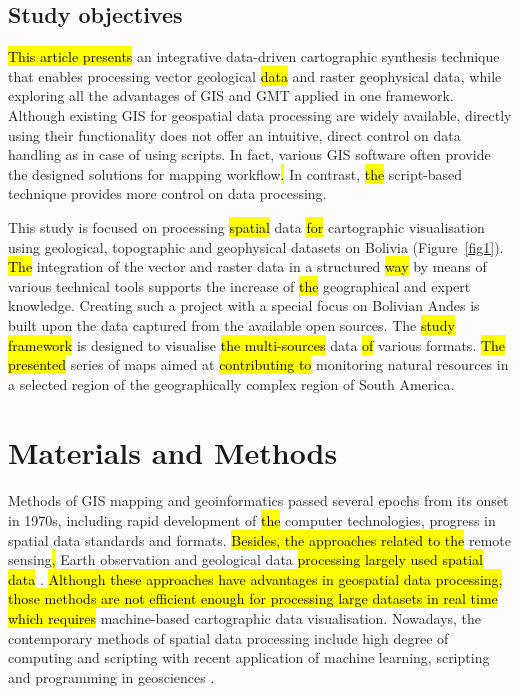 \documentclass[data,article,submit,pdftex,moreauthors]{Definitions/mdpi}
\begin{document}
\subsection{Study objectives}
\hl{This article presents} an integrative data-driven cartographic synthesis technique that enables processing vector geological \hl{data} and raster geophysical data, while exploring all the advantages of GIS and GMT applied in one framework. Although existing GIS for geospatial data processing are widely available, directly using their functionality does not offer an intuitive, direct control on data handling as in case of using scripts. In fact, various GIS software often provide the designed solutions for mapping workflow\hl{.} In contrast, \hl{the} script-based technique provides more control on data processing. 

This study is focused on processing \hl{spatial} data \hl{for} cartographic visualisation using geological, topographic and geophysical datasets on Bolivia (Figure~\ref{fig1}). \hl{The} integration of the vector and raster data in a structured \hl{way} by means of various technical tools supports the increase of \hl{the} geographical and expert knowledge. Creating such a project with a special focus on Bolivian Andes is built upon the data captured from the available open sources. The \hl{study framework} is designed to visualise \hl{the multi-sources} data \hl{of }various formats. \hl{The presented} series of maps aimed at \hl{contributing to} monitoring natural resources in a selected region of the geographically complex region of South America.


\section{Materials and Methods}

Methods of GIS mapping and geoinformatics passed several epochs from its onset in 1970s, including rapid development of \hl{the} computer technologies, progress in spatial data standards and formats. \hl{Besides, the approaches related to the }remote sensing\hl{, }Earth observation and geological data\hl{ processing largely used spatial data}   \cite{Allenby1987,Lindh2021,Lemenkova202127}. \hl{Although these approaches have advantages in geospatial data processing, those methods are not efficient enough for processing large datasets in real time which requires} machine-based cartographic data visualisation. Nowadays, the contemporary methods of spatial data processing include high degree of computing and scripting with recent application of machine learning, scripting and programming in geosciences \cite{Lietal,Lemenkov2021a,Zhou,Lemenkov2021b}. 
\end{document}

